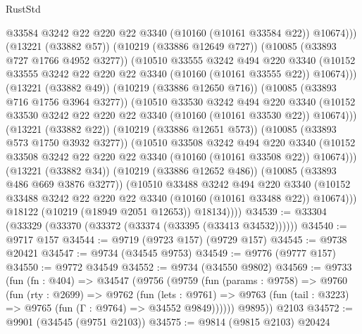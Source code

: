 \begin{lexlean}{RustStd}
\begin{coremodule}
                          @33584
                          @3242
                          @22
                          @220
                          @22
                          @3340
                          (@10160 (@10161 @33584 @22))
                          @10674)))
                    (@13221 (@33882 @57))
                    (@10219 (@33886 @12649 @727))
                    (@10085 (@33893 @727 @1766 @4952 @3277))
                    (@10510
                      @33555
                      @3242
                      @494
                      @220
                      @3340
                      (@10152 @33555 @3242 @22 @220 @22 @3340 (@10160 (@10161 @33555 @22)) @10674)))
                  (@13221 (@33882 @49))
                  (@10219 (@33886 @12650 @716))
                  (@10085 (@33893 @716 @1756 @3964 @3277))
                  (@10510
                    @33530
                    @3242
                    @494
                    @220
                    @3340
                    (@10152 @33530 @3242 @22 @220 @22 @3340 (@10160 (@10161 @33530 @22)) @10674)))
                (@13221 (@33882 @22))
                (@10219 (@33886 @12651 @573))
                (@10085 (@33893 @573 @1750 @3932 @3277))
                (@10510
                  @33508
                  @3242
                  @494
                  @220
                  @3340
                  (@10152 @33508 @3242 @22 @220 @22 @3340 (@10160 (@10161 @33508 @22)) @10674)))
              (@13221 (@33882 @34))
              (@10219 (@33886 @12652 @486))
              (@10085 (@33893 @486 @669 @3876 @3277))
              (@10510
                @33488
                @3242
                @494
                @220
                @3340
                (@10152 @33488 @3242 @22 @220 @22 @3340 (@10160 (@10161 @33488 @22)) @10674)))
            @18122
            (@10219 (@18949 @2051 @12653))
            @18134))))
@34539 := @33304 (@33329 (@33370 (@33372 (@33374 (@33395 (@33413 @34532))))))
@34540 := @9717 @157
@34544 := @9719 (@9723 @157) (@9729 @157)
@34545 := @9738 @20421
@34547 := @9734 (@34545 @9753)
@34549 := @9776 (@9777 @157)
@34550 := @9772 @34549
@34552 := @9734 (@34550 @9802)
@34569 := @9733
    (fun (fn : @404) =>
    @34547
      (@9756
        (@9759
          (fun (params : @9758) =>
          @9760
            (fun (rty : @2699) =>
            @9762
              (fun (lets : @9761) =>
              @9763 (fun (tail : @3223) => @9765 (fun (Γ : @9764) => @34552 @9849))))))
        @9895))
    @2103
@34572 := @9901 (@34545 (@9751 @2103))
@34575 := @9814 (@9815 @2103) @20424

\end{coremodule}
\end{lexlean}
